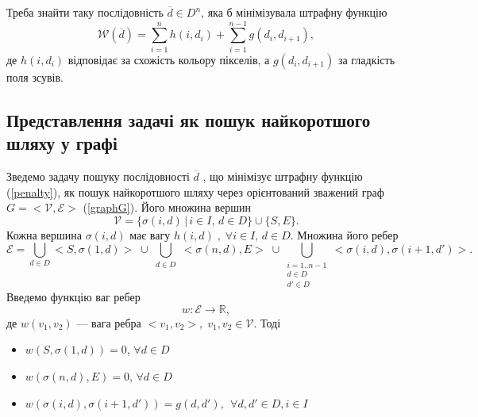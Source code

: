 Треба знайти таку послідовність $\overline{d} \in {D}^n$, яка б мінімізувала штрафну функцію
\begin{equation}
	\mathcal{W}(\overline{d}) = \sum\limits_{i = 1}^n h(i, d_i) + \sum\limits_{i = 1}^{n-1} g(d_i, d_{i + 1}),
\end{equation}
\label{penalty}
де $ h(i, d_i) $ відповідає за схожість кольору пікселів, а $ g(d_i, d_{i + 1}) $ за гладкість поля зсувів.


\subsection{Представлення задачі як пошук найкоротшого шляху у графі}\label{offline_graph}
Зведемо задачу пошуку послідовності $ \overline{d} $ , що мінімізує штрафну функцію (\ref{penalty}), як пошук найкоротшого шляху через орієнтований зважений граф $G = <\mathcal{V}, \mathcal{E}>$ (\ref{graphG}).
Його множина вершин 
$$ \mathcal{V} = \{ \sigma(i, d) \, | \, i \in I, \, d \in D \} \cup \{ S, E \} .$$
Кожна вершина $\sigma(i, d)$ має вагу $h(i, d) \;, \; \forall i \in I, \, d \in D .$ Множина його ребер
$$ \mathcal{E} = \bigcup\limits_{d \in D }<S, \sigma(1, d) > \; \cup \bigcup\limits_{\substack{d \in D}} <\sigma(n, d), E > \; \cup 
\bigcup\limits_{\substack{i = 1..n-1 \\d \in D \\d' \in D}} <\sigma(i, d), \sigma(i+1, d') >.$$
Введемо функцію ваг ребер 
$$ w : \mathcal{E} \rightarrow \mathbb{R}, $$
де $ w(v_1, v_2) $ ---  вага ребра $ <v_1, v_2>, \; v_1, v_2 \in \mathcal{V} $.
Тоді
\begin{itemize}
\item  $ w(S,  \sigma(1, d) ) = 0 $, $ \forall d \in D $
\item  $ w(\sigma(n, d), E ) = 0 $, $ \forall d \in D $
\item  $ w(\sigma(i, d), \sigma(i + 1, d ') ) = g(d, d') $, $ \; \forall d, d' \in D, i \in I $
\end{itemize}

